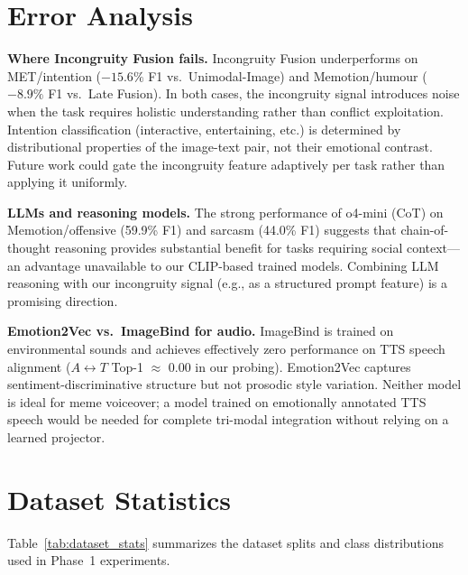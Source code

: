 \section{Error Analysis}
\label{sec:error_analysis}

\textbf{Where Incongruity Fusion fails.}
Incongruity Fusion underperforms on MET/intention ($-15.6\%$ F1 vs.\ Unimodal-Image) and
Memotion/humour ($-8.9\%$ F1 vs.\ Late Fusion). In both cases, the incongruity signal introduces
noise when the task requires holistic understanding rather than conflict exploitation.
Intention classification (interactive, entertaining, etc.) is determined by distributional
properties of the image-text pair, not their emotional contrast. Future work could gate the
incongruity feature adaptively per task rather than applying it uniformly.

\textbf{LLMs and reasoning models.}
The strong performance of o4-mini (CoT) on Memotion/offensive (59.9\% F1) and sarcasm (44.0\% F1)
suggests that chain-of-thought reasoning provides substantial benefit for tasks requiring social
context—an advantage unavailable to our CLIP-based trained models. Combining LLM reasoning with
our incongruity signal (e.g., as a structured prompt feature) is a promising direction.

\textbf{Emotion2Vec vs.\ ImageBind for audio.}
ImageBind is trained on environmental sounds and achieves effectively zero performance on TTS
speech alignment ($A \leftrightarrow T$ Top-1 $\approx$ 0.00 in our probing). Emotion2Vec
captures sentiment-discriminative structure but not prosodic style variation. Neither model is
ideal for meme voiceover; a model trained on emotionally annotated TTS speech would be needed
for complete tri-modal integration without relying on a learned projector.

\section{Dataset Statistics}
\label{sec:dataset_stats}

Table~\ref{tab:dataset_stats} summarizes the dataset splits and class distributions used in
Phase~1 experiments.

